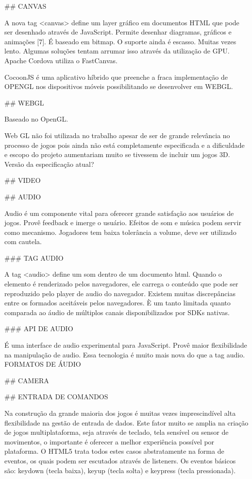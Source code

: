 \documentclass[11pt,a4paper]{article}
\begin{document}
## CANVAS

A nova tag <canvas> define um layer gráfico em documentos HTML que pode ser desenhado através de JavaScript.
Permite desenhar diagramas, gráficos e animações [7]. É baseado em bitmap.
O suporte ainda é escasso.
Muitas vezes lento. Algumas soluções tentam arrumar isso através da utilização de GPU.
Apache Cordova utiliza o FastCanvas.

CocoonJS é uma aplicativo híbrido que preenche a fraca implementação de OPENGL nos dispositivos móveis possibilitando se desenvolver em WEBGL.

## WEBGL

Baseado no OpenGL.

Web GL não foi utilizada no trabalho apesar de ser de grande relevância no processo de jogos pois ainda não está completamente especificada e a dificuldade e escopo do projeto aumentariam muito se tivessem de incluir um jogos 3D.
Versão da especificação atual?

## VIDEO

## AUDIO

Audio é um componente vital para oferecer grande satisfação aos usuários de jogos. Provê feedback e imerge o usuário. Efeitos de som e música podem servir como mecanismo. Jogadores tem baixa tolerância a volume, deve ser utilizado com cautela.

### TAG AUDIO

A tag <audio> define um som dentro de um documento html. Quando o elemento é renderizado pelos navegadores, ele carrega o conteúdo que pode ser reproduzido pelo player de audio do navegador. Existem muitas discrepâncias entre os formados aceitáveis pelos navegadores. È um tanto limitada quanto comparada ao áudio de múltiplos canais disponibilizados por SDKs nativas.

### API DE AUDIO

É uma interface de audio experimental para JavaScript. Provê maior flexibilidade na manipulação de audio. Essa tecnologia é muito mais nova do que a tag audio.
FORMATOS DE ÁUDIO

## CAMERA

## ENTRADA DE COMANDOS

Na construção da grande maioria dos jogos é muitas vezes imprescindível alta flexibilidade na gestão de entrada de dados. Este fator muito se amplia na criação de jogos multiplataforma, seja através de teclado, tela sensível ou sensor de movimentos, o importante é oferecer a melhor experiência possível por plataforma. O HTML5 trata todos estes casos abstratamente na forma de eventos, os quais podem ser escutados através de listeners. Os eventos básicos são: keydown (tecla baixa), keyup (tecla solta) e keypress (tecla pressionada).
\end{document}
